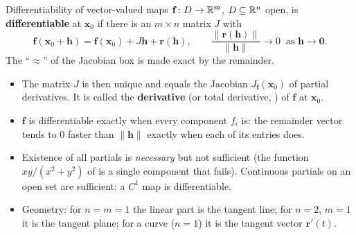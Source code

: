 \begin{rulebox}{Differentiability of vector-valued maps}
$\mathbf{f}\colon D\to\mathbb{R}^{m}$, $D\subseteq\mathbb{R}^{n}$ open, is
\textbf{differentiable} at $\mathbf{x}_{0}$ if there is an $m\times n$
matrix $J$ with
\[
  \mathbf{f}(\mathbf{x}_{0}+\mathbf{h})=\mathbf{f}(\mathbf{x}_{0})
  +J\mathbf{h}+\mathbf{r}(\mathbf{h}),
  \qquad
  \frac{\|\mathbf{r}(\mathbf{h})\|}{\|\mathbf{h}\|}\to0\ \text{ as }
  \mathbf{h}\to\mathbf{0} .
\]
The ``$\approx$'' of the Jacobian box is made exact by the remainder.
\begin{itemize}[leftmargin=1.6em,itemsep=0.3ex]
  \item The matrix $J$ is then unique and equals the Jacobian
        $J_{\mathbf{f}}(\mathbf{x}_{0})$ of partial derivatives. It is
        called the \textbf{derivative} (or total derivative,
        ) of $\mathbf{f}$ at $\mathbf{x}_{0}$.
  \item $\mathbf{f}$ is differentiable exactly when every component
        $f_{i}$ is: the remainder vector tends to $0$ faster than
        $\|\mathbf{h}\|$ exactly when each of its entries does.
  \item Existence of all partials is \emph{necessary} but not sufficient
        (the function $xy/(x^{2}+y^{2})$ of  is a single component that fails).
        Continuous partials on an open set are sufficient: a $C^{1}$ map is
        differentiable.
  \item Geometry: for $n=m=1$ the linear part is the tangent line; for
        $n=2$, $m=1$ it is the tangent plane; for a curve ($n=1$) it is the
        tangent vector $\mathbf{r}'(t)$.
\end{itemize}
\end{rulebox}

